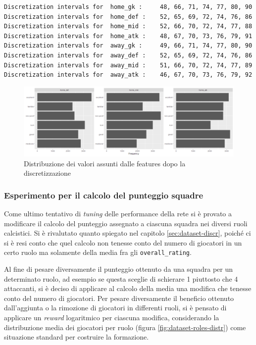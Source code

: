 \documentclass[hidelinks, 12pt]{article}
\begin{document}
\begin{verbatim}
Discretization intervals for  home_gk :     48, 66, 71, 74, 77, 80, 90
Discretization intervals for  home_def :    52, 65, 69, 72, 74, 76, 86
Discretization intervals for  home_mid :    52, 66, 70, 72, 74, 77, 88
Discretization intervals for  home_atk :    48, 67, 70, 73, 76, 79, 91
Discretization intervals for  away_gk :     49, 66, 71, 74, 77, 80, 90
Discretization intervals for  away_def :    52, 65, 69, 72, 74, 76, 86
Discretization intervals for  away_mid :    51, 66, 70, 72, 74, 77, 89
Discretization intervals for  away_atk :    46, 67, 70, 73, 76, 79, 92
\end{verbatim}

\begin{figure}[H]
	\centering
	\includegraphics[scale=0.45]{images/06_04_discr_distr.png}
	\caption[Distribuzione dei valori assunti dalle features dopo la discretizzazione]{Distribuzione dei valori assunti dalle features dopo la discretizzazione}
	\label{fig:perf-discr-distr}
\end{figure}


\subsubsection{Esperimento per il calcolo del punteggio squadre}

Come ultimo tentativo di \textit{tuning} delle performance della rete si è provato a modificare il calcolo del punteggio assegnato a ciascuna squadra nei diversi ruoli calcistici. Si è rivalutato quanto spiegato nel capitolo \ref{sec:dataset-discr}, poiché ci si è resi conto che quel calcolo non tenesse conto del numero di giocatori in un certo ruolo ma solamente della media fra gli \texttt{overall\_rating}.

Al fine di pesare diversamente il punteggio ottenuto da una squadra per un determinato ruolo, ad esempio se questa sceglie di schierare 1 piuttosto che 4 attaccanti, si è deciso di applicare al calcolo della media una modifica che tenesse conto del numero di giocatori. Per pesare diversamente il beneficio ottenuto dall'aggiunta o la rimozione di giocatori in differenti ruoli, si è pensato di applicare un \textit{reward} logaritmico per ciascuna modifica, considerando la distribuzione media dei giocatori per ruolo (figura \ref{fig:dataset-roles-distr}) come situazione standard per costruire la formazione.
\end{document}
